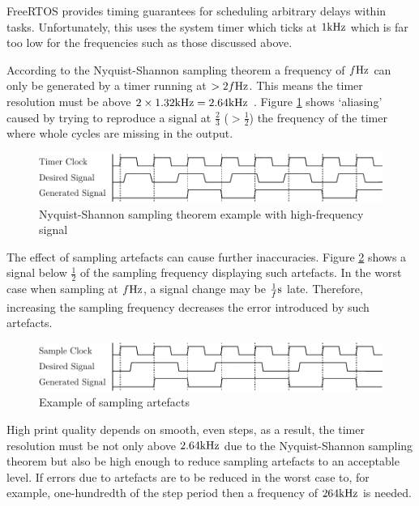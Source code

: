 				FreeRTOS provides timing guarantees for scheduling arbitrary delays
				within tasks. Unfortunately, this uses the system timer which ticks at
				$1\textrm{kHz}$ which is far too low for the frequencies such as those discussed
				above. 
				
				According to the Nyquist-Shannon sampling theorem a frequency of $f\textrm{Hz}$
				can only be generated by a timer running at $> 2f\textrm{Hz}$. This means the
				timer resolution must be above $2 \times 1.32\textrm{kHz} = 2.64\textrm{kHz}$
				\cite{shannon}. Figure \ref{fig:nyquist} shows `aliasing' caused by
				trying to reproduce a signal at $\frac{2}{3}$ ($> \frac{1}{2}$) the
				frequency of the timer where whole cycles are missing in the output.
				
				\begin{figure}
					\includegraphics[width=1\textwidth]{diagrams/nyquist.pdf}
					\caption{Nyquist-Shannon sampling theorem example with high-frequency
					signal}
					\label{fig:nyquist}
				\end{figure}
				
				The effect of sampling artefacts can cause further inaccuracies. Figure
				\ref{fig:artefacts} shows a signal below $\frac{1}{2}$ of the sampling
				frequency displaying such artefacts. In the worst case when sampling at
				$f\textrm{Hz}$, a signal change may be $\frac{1}{f}\textrm{s}$ late. Therefore,
				increasing the sampling frequency decreases the error introduced by such
				artefacts.
				
				\begin{figure}
					\includegraphics[width=1\textwidth]{diagrams/artefacts.pdf}
					\caption{Example of sampling artefacts}
					\label{fig:artefacts}
				\end{figure}
				
				High print quality depends on smooth, even steps, as a result, the timer
				resolution must be not only above $2.64\textrm{kHz}$ due to the Nyquist-Shannon
				sampling theorem but also be high enough to reduce sampling artefacts to
				an acceptable level. If errors due to artefacts are to be reduced in the
				worst case to, for example, one-hundredth of the step period then a
				frequency of $264\textrm{kHz}$ is needed.
				
